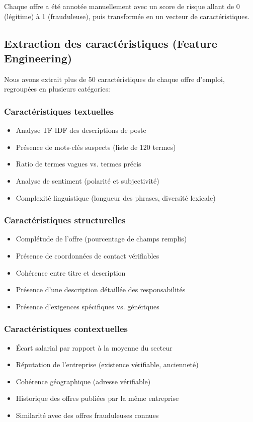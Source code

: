 \documentclass[10pt,a4paper,twocolumn]{article}
\begin{document}
Chaque offre a été annotée manuellement avec un score de risque allant de 0 (légitime) à 1 (frauduleuse), puis transformée en un vecteur de caractéristiques.

\subsection{Extraction des caractéristiques (Feature Engineering)}
Nous avons extrait plus de 50 caractéristiques de chaque offre d'emploi, regroupées en plusieurs catégories:

\subsubsection{Caractéristiques textuelles}
\begin{itemize}
    \item Analyse TF-IDF des descriptions de poste
    \item Présence de mots-clés suspects (liste de 120 termes)
    \item Ratio de termes vagues vs. termes précis
    \item Analyse de sentiment (polarité et subjectivité)
    \item Complexité linguistique (longueur des phrases, diversité lexicale)
\end{itemize}

\subsubsection{Caractéristiques structurelles}
\begin{itemize}
    \item Complétude de l'offre (pourcentage de champs remplis)
    \item Présence de coordonnées de contact vérifiables
    \item Cohérence entre titre et description
    \item Présence d'une description détaillée des responsabilités
    \item Présence d'exigences spécifiques vs. génériques
\end{itemize}

\subsubsection{Caractéristiques contextuelles}
\begin{itemize}
    \item Écart salarial par rapport à la moyenne du secteur
    \item Réputation de l'entreprise (existence vérifiable, ancienneté)
    \item Cohérence géographique (adresse vérifiable)
    \item Historique des offres publiées par la même entreprise
    \item Similarité avec des offres frauduleuses connues
\end{itemize}
\end{document}
